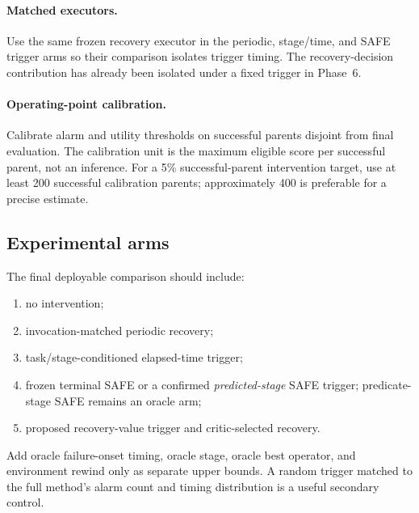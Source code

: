 \paragraph{Matched executors.}
Use the same frozen recovery executor in the periodic, stage/time, and SAFE trigger arms so their comparison isolates trigger timing. The recovery-decision contribution has already been isolated under a fixed trigger in Phase~6.

\paragraph{Operating-point calibration.}
Calibrate alarm and utility thresholds on successful parents disjoint from final evaluation. The calibration unit is the maximum eligible score per successful parent, not an inference. For a 5\% successful-parent intervention target, use at least 200 successful calibration parents; approximately 400 is preferable for a precise estimate.



\subsection{Experimental arms}

The final deployable comparison should include:
\begin{enumerate}
  \item no intervention;
  \item invocation-matched periodic recovery;
  \item task/stage-conditioned elapsed-time trigger;
  \item frozen terminal SAFE or a confirmed \emph{predicted-stage} SAFE trigger; predicate-stage SAFE remains an oracle arm;
  \item proposed recovery-value trigger and critic-selected recovery.
\end{enumerate}
Add oracle failure-onset timing, oracle stage, oracle best operator, and environment rewind only as separate upper bounds. A random trigger matched to the full method's alarm count and timing distribution is a useful secondary control.

